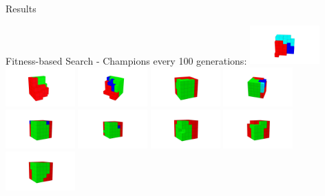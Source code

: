 \documentclass{beamer}
\begin{document}
\begin{frame}[allowframebreaks]{Results}
\begin{minipage}{\textwidth}
\begin{block}{Fitness-based Search - Champions every 100 generations:}
\includegraphics[width=0.2\textwidth]{../Figures/Robots/f_3_g_100.jpg}
\includegraphics[width=0.2\textwidth]{../Figures/Robots/f_3_g_200.jpg}
\includegraphics[width=0.2\textwidth]{../Figures/Robots/f_3_g_300.jpg}
\includegraphics[width=0.2\textwidth]{../Figures/Robots/f_3_g_400.jpg}
\includegraphics[width=0.2\textwidth]{../Figures/Robots/f_3_g_500.jpg}\\
\includegraphics[width=0.2\textwidth]{../Figures/Robots/f_3_g_600.jpg}
\includegraphics[width=0.2\textwidth]{../Figures/Robots/f_3_g_700.jpg}
\includegraphics[width=0.2\textwidth]{../Figures/Robots/f_3_g_800.jpg}
\includegraphics[width=0.2\textwidth]{../Figures/Robots/f_3_g_900.jpg}
\includegraphics[width=0.2\textwidth]{../Figures/Robots/f_3_g_1000.jpg}
\end{block}
\end{minipage}


\end{frame}
\end{document}
